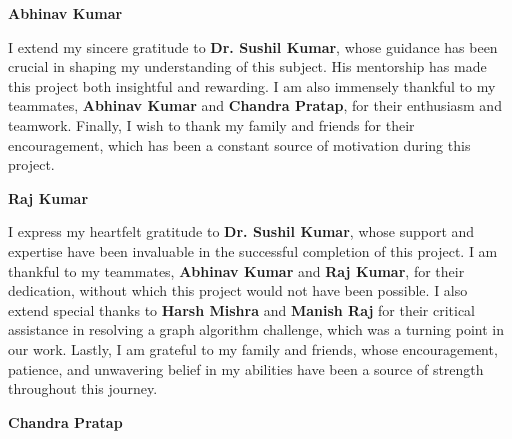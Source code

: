 \documentclass[12pt]{article}
\begin{document}
	\vspace{0.1cm} 
	\hfill \textbf{Abhinav Kumar} 
	
	\vspace{0.2cm} 
	
	I extend my sincere gratitude to \textbf{Dr. Sushil Kumar}, whose guidance has been crucial in shaping my understanding of this subject. His mentorship has made this project both insightful and rewarding. I am also immensely thankful to my teammates, \textbf{Abhinav Kumar} and \textbf{Chandra Pratap}, for their enthusiasm and teamwork. Finally, I wish to thank my family and friends for their encouragement, which has been a constant source of motivation during this project.
	
	\vspace{0.1cm} 
	\hfill \textbf{Raj Kumar} 
	
	\vspace{0.2cm} 
	
	I express my heartfelt gratitude to \textbf{Dr. Sushil Kumar}, whose support and expertise have been invaluable in the successful completion of this project. I am thankful to my teammates, \textbf{Abhinav Kumar} and \textbf{Raj Kumar}, for their dedication, without which this project would not have been possible. I also extend special thanks to \textbf{Harsh Mishra} and \textbf{Manish Raj} for their critical assistance in resolving a graph algorithm challenge, which was a turning point in our work. Lastly, I am grateful to my family and friends, whose encouragement, patience, and unwavering belief in my abilities have been a source of strength throughout this journey.
	
	\vspace{0.2cm} 
	\hfill \textbf{Chandra Pratap} 
	
\end{document}
